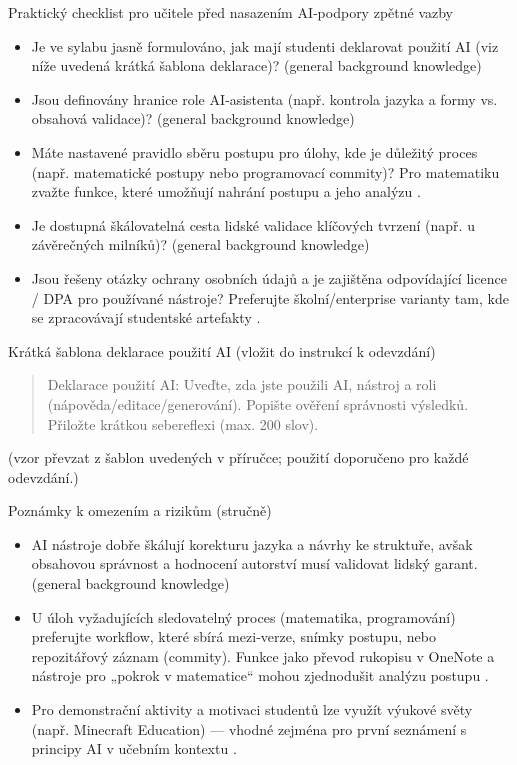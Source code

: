 \documentclass{report}%
\begin{document}
Praktický checklist pro učitele před nasazením AI‑podpory zpětné vazby
\begin{itemize}
  \item Je ve sylabu jasně formulováno, jak mají studenti deklarovat použití AI (viz níže uvedená krátká šablona deklarace)? (general background knowledge)
  \item Jsou definovány hranice role AI‑asistenta (např. kontrola jazyka a formy vs. obsahová validace)? (general background knowledge)
  \item Máte nastavené pravidlo sběru postupu pro úlohy, kde je důležitý proces (např. matematické postupy nebo programovací commity)? Pro matematiku zvažte funkce, které umožňují nahrání postupu a jeho analýzu \cite{kb_ai_101_tipu_pdf_04e4a115_page_8_1}.
  \item Je dostupná škálovatelná cesta lidské validace klíčových tvrzení (např. u závěrečných milníků)? (general background knowledge)
  \item Jsou řešeny otázky ochrany osobních údajů a je zajištěna odpovídající licence / DPA pro používané nástroje? Preferujte školní/enterprise varianty tam, kde se zpracovávají studentské artefakty \cite{kb_ai_101_tipu_pdf_04e4a115_page_3_1}.
\end{itemize}

Krátká šablona deklarace použití AI (vložit do instrukcí k odevzdání)
\begin{quote}
  Deklarace použití AI: Uveďte, zda jste použili AI, nástroj a roli (nápověda/editace/generování). Popište ověření správnosti výsledků. Přiložte krátkou sebereflexi (max. 200 slov).
\end{quote}
(vzor převzat z šablon uvedených v příručce; použití doporučeno pro každé odevzdání.)

Poznámky k omezením a rizikům (stručně)
\begin{itemize}
  \item AI nástroje dobře škálují korekturu jazyka a návrhy ke struktuře, avšak obsahovou správnost a hodnocení autorství musí validovat lidský garant. (general background knowledge)
  \item U úloh vyžadujících sledovatelný proces (matematika, programování) preferujte workflow, které sbírá mezi‑verze, snímky postupu, nebo repozitářový záznam (commity). Funkce jako převod rukopisu v OneNote a nástroje pro „pokrok v matematice“ mohou zjednodušit analýzu postupu \cite{kb_ai_101_tipu_pdf_04e4a115_page_8_1}.
  \item Pro demonstrační aktivity a motivaci studentů lze využít výukové světy (např. Minecraft Education) — vhodné zejména pro první seznámení s principy AI v učebním kontextu \cite{kb_ai_101_tipu_pdf_04e4a115_page_15_2}.
\end{itemize}
\end{document}
